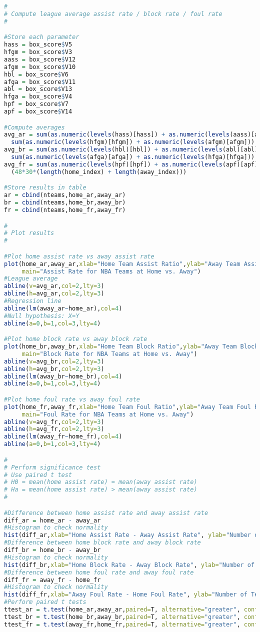 \documentclass{article}
\begin{document}
\begin{lstlisting}[language=R, caption=R Code to Perform Data Analysis]
#
# Compute league average assist rate / block rate / foul rate
#

#Store each parameter
hass = box_score$V5
hfgm = box_score$V3
aass = box_score$V12
afgm = box_score$V10
hbl = box_score$V6
afga = box_score$V11
abl = box_score$V13
hfga = box_score$V4
hpf = box_score$V7
apf = box_score$V14

#Compute averages
avg_ar = sum(as.numeric(levels(hass)[hass]) + as.numeric(levels(aass)[aass])) / 
  sum(as.numeric(levels(hfgm)[hfgm]) + as.numeric(levels(afgm)[afgm]))
avg_br = sum(as.numeric(levels(hbl)[hbl]) + as.numeric(levels(abl)[abl])) / 
  sum(as.numeric(levels(afga)[afga]) + as.numeric(levels(hfga)[hfga]))
avg_fr = sum(as.numeric(levels(hpf)[hpf]) + as.numeric(levels(apf)[apf])) /
  (48*30*(length(home_index) + length(away_index)))

#Store results in table
ar = cbind(nteams,home_ar,away_ar)
br = cbind(nteams,home_br,away_br)
fr = cbind(nteams,home_fr,away_fr)

#
# Plot results
#

#Plot home assist rate vs away assist rate
plot(home_ar,away_ar,xlab="Home Team Assist Ratio",ylab="Away Team Assist Ratio",
     main="Assist Rate for NBA Teams at Home vs. Away")
#League average
abline(v=avg_ar,col=2,lty=3)
abline(h=avg_ar,col=2,lty=3)
#Regression line
abline(lm(away_ar~home_ar),col=4)
#Null hypothesis: X=Y
abline(a=0,b=1,col=3,lty=4)

#Plot home block rate vs away block rate
plot(home_br,away_br,xlab="Home Team Block Ratio",ylab="Away Team Block Ratio",
     main="Block Rate for NBA Teams at Home vs. Away")
abline(v=avg_br,col=2,lty=3)
abline(h=avg_br,col=2,lty=3)
abline(lm(away_br~home_br),col=4)
abline(a=0,b=1,col=3,lty=4)

#Plot home foul rate vs away foul rate
plot(home_fr,away_fr,xlab="Home Team Foul Ratio",ylab="Away Team Foul Ratio",
     main="Foul Rate for NBA Teams at Home vs. Away")
abline(v=avg_fr,col=2,lty=3)
abline(h=avg_fr,col=2,lty=3)
abline(lm(away_fr~home_fr),col=4)
abline(a=0,b=1,col=3,lty=4)

#
# Perform significance test
# Use paired t test
# H0 = mean(home assist rate) = mean(away assist rate)
# Ha = mean(home assist rate) > mean(away assist rate)
#

#Difference between home assist rate and away assist rate
diff_ar = home_ar - away_ar
#Histogram to check normality
hist(diff_ar,xlab="Home Assist Rate - Away Assist Rate", ylab="Number of Teams")
#Difference between home block rate and away block rate
diff_br = home_br - away_br
#Histogram to check normality
hist(diff_br,xlab="Home Block Rate - Away Block Rate", ylab="Number of Teams")
#Difference between home foul rate and away foul rate
diff_fr = away_fr - home_fr
#Histogram to check normality
hist(diff_fr,xlab="Away Foul Rate - Home Foul Rate", ylab="Number of Teams")
#Perform paired t tests
ttest_ar = t.test(home_ar,away_ar,paired=T, alternative="greater", conf.level = 0.9)
ttest_br = t.test(home_br,away_br,paired=T, alternative="greater", conf.level = 0.9)
ttest_fr = t.test(away_fr,home_fr,paired=T, alternative="greater", conf.level = 0.9)
\end{lstlisting}
\end{document}
